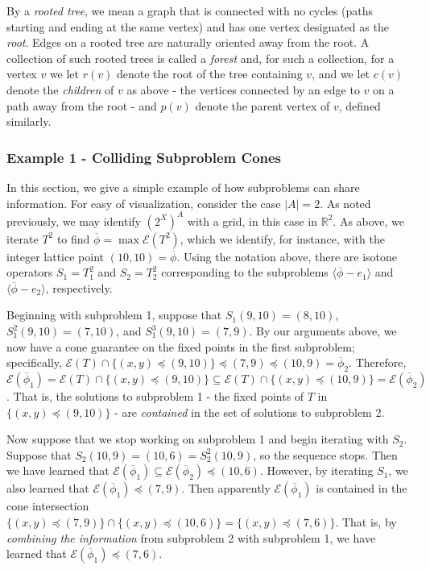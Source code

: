 \documentclass[11pt,reqno]{amsart}
\theoremstyle{definition}
\numberwithin{equation}{section}
\newcommand{\mr}{\mathbb{R}}
\newcommand{\ol}{\overline}
\newcommand{\lag}{\langle}
\newcommand{\rag}{\rangle}
\newcommand{\pre}{\phi}
\newcommand{\prealloc}{(2^X)^A}
\newcommand{\sub}{\subseteq}
\newcommand{\fix}{\mathcal{E}}
\newcommand{\peq}{\preceq}
\newcommand{\toppre}{\ol{\pre}}
\begin{document}
By a \emph{rooted tree}, we mean a graph that is connected with no cycles (paths starting and ending at the same vertex) and has one vertex designated as the \emph{root}. 
Edges on a rooted tree are naturally oriented away from the root. 
A collection of such rooted trees is called a \emph{forest} and, for such a collection, for a vertex $v$ we let $r(v)$ denote the root of the tree containing $v$, and we let $c(v)$ denote the \emph{children} of $v$ as above - the vertices connected by an edge to $v$ on a path away from the root - and $p(v)$ denote the parent vertex of $v$, defined similarly.  

\subsubsection{Example 1 - Colliding Subproblem Cones}
In this section, we give a simple example of how subproblems can share information.
For easy of visualization, consider the case $|A| = 2$. As noted previously, we may identify $\prealloc$ with a grid, in this case in $\mr^2$.
As above, we iterate $T^2$ to find $\toppre = \max \fix(T^2)$, which we identify, for instance, with the integer lattice point $(10,10) = \toppre$. 
Using the notation above, there are isotone operators $S_1 = T_1^2$ and $S_2 = T_2^2$ corresponding to the subproblems $\lag \toppre - e_1 \rag$ and $\lag \toppre - e_2 \rag$, respectively. 

Beginning with subproblem 1, suppose that $S_1 (9,10) = (8,10)$, $S_1^2 (9,10) = (7,10)$, and $S_1^3 (9,10) = (7,9)$.
By our arguments above, we now have a cone guarantee on the fixed points in the first subproblem; specifically, $\fix(T) \cap \{(x,y) \peq (9,10)\} \peq (7,9) \peq (10,9) = \toppre_2$.
Therefore, $\fix(\toppre_1) = \fix(T) \cap \{(x,y) \peq (9,10)\} \sub \fix(T) \cap \{(x,y) \peq (10,9)\} = \fix(\toppre_2)$. 
That is, the solutions to subproblem 1 - the fixed points of $T$ in $\{(x,y) \peq (9,10)\}$ - are \emph{contained} in the set of solutions to subproblem 2.  

Now suppose that we stop working on subproblem 1 and begin iterating with $S_2$.
Suppose that $S_2(10,9) = (10,6) = S_2^2(10,9)$, so the sequence stops.
Then we have learned that $\fix(\toppre_1) \sub \fix(\toppre_2) \peq (10,6)$. 
However, by iterating $S_1$, we also learned that $\fix(\toppre_1) \peq (7,9)$. 
Then apparently $\fix(\toppre_1)$ is contained in the cone intersection $\{(x,y) \peq (7,9)\} \cap \{(x,y) \peq (10, 6)\} = \{(x,y) \peq (7,6) \}$. 
That is, by \emph{combining the information} from subproblem 2 with subproblem 1, we have learned that $\fix(\toppre_1) \peq (7,6)$. 
\end{document}
